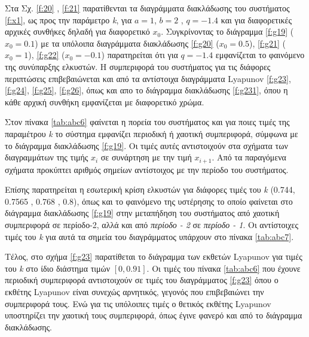Στα Σχ. \ref{f:20} , \ref{f:21} παρατίθενται τα διαγράμματα διακλάδωσης του συστήματος \ref{f:x1}, ως προς την παράμετρο \emph{k}, για $a = 1$, $b = 2$ , $q =- 1.4$ και για διαφορετικές αρχικές συνθήκες δηλαδή για διαφορετικό \(x_0\). Συγκρίνοντας το διάγραμμα \ref{f:g19} (\(x_0=0.1\)) με τα υπόλοιπα διαγράμματα διακλάδωσης \ref{f:g20} (\(x_0=0.5\)), \ref{f:g21} (\(x_0=1\)), \ref{f:g22} (\(x_0=-0.1\)) παρατηρείται ότι για $q=-1.4$ εμφανίζεται το φαινόμενο της συνύπαρξης ελκυστών. Η συμπεριφορά του συστήματος για τις διάφορες περιπτώσεις επιβεβαιώνεται και από τα αντίστοιχα διαγράμματα Lyapunov \ref{f:g23}, \ref{f:g24}, \ref{f:g25}, \ref{f:g26},
όπως και απο το διάγραμμα διακλάδωσης \ref{f:g231}, όπου η κάθε αρχική συνθήκη εμφανίζεται με διαφορετικό χρώμα.

Στον πίνακα \ref{tab:abc6} φαίνεται η πορεία του συστήματος και για ποιες τιμές της παραμέτρου \emph{k} το σύστημα εμφανίζει περιοδική ή χαοτική συμπεριφορά, σύμφωνα με το διάγραμμα διακλάδωσης \ref{f:g19}. Οι τιμές αυτές αντιστοιχούν στα σχήματα των διαγραμμάτων της τιμής \(x_i\) σε συνάρτηση με την τιμή \(x_{i+1}\). Από τα παραγόμενα σχήματα προκύπτει αριθμός σημείων αντίστοιχος με την περίοδο του συστήματος.

Επίσης παρατηρείται η εσωτερική κρίση ελκυστών για διάφορες τιμές του \emph{k} (0.744, 0.7565 , 0.768 , 0.8), όπως και το φαινόμενο της υστέρησης το οποίο φαίνεται στο διάγραμμα διακλάδωσης \ref{f:g19} στην μεταπήδηση του συστήματος από χαοτική συμπεριφορά σε περίοδο-2, αλλά και από \emph{περίοδο - 2} σε \emph{περίοδο - 1}. Οι αντίστοιχες τιμές του \emph{k} για αυτά τα σημεία του διαγράμματος υπάρχουν στο πίνακα \ref{tab:abc7}.

Τέλος, στο σχήμα \ref{f:g23} παρατίθεται το διάγραμμα των εκθετών Lyapunov για τιμές του \emph{k} στο ίδιο διάστημα τιμών $[0, 0.91]$. Οι τιμές του πίνακα \ref{tab:abc6} που έχουνε περιοδική συμπεριφορά αντιστοιχούν σε τιμές του διαγράμματος \ref{f:g23} όπου ο εκθέτης Lyapunov είναι συνεχώς αρνητικός, γεγονός που επιβεβαιώνει την συμπεριφορά τους. Ενώ για τις υπόλοιπες τιμές ο θετικός εκθέτης Lyapunov υποστηρίζει την χαοτική τους συμπεριφορά, όπως έγινε φανερό και από το διάγραμμα διακλάδωσης.

